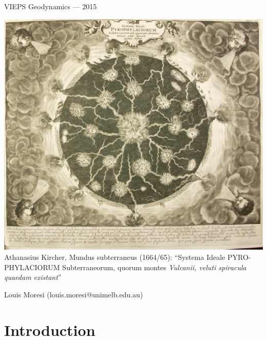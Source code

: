\documentclass[10pt]{article}
\begin{document}
\newcommand{\dGamma}{\mathbf{d}\boldsymbol{\Gamma}}
\newcommand{\erfc}{\mbox{\rm erfc}}
\newcommand{\Red     }[1]{\textcolor[rgb]{0.7,0.0,0.0}{#1}} 
\newcommand{\Green   }[1]{\textcolor[rgb]{0.0,0.7,0.0}{ #1}} 
\newcommand{\Blue    }[1]{\textcolor[rgb]{0.0,0.0,0.7}{ #1}} 
\newcommand{\Emerald }[1]{\textcolor[rgb]{0.0,0.7,0.3}{ #1}} 


\thispagestyle{empty}


\mbox{}
\vfill

{\Large VIEPS Geodynamics --- 2015} \\[2ex]
\vfill

\begin{center}
\includegraphics[width=0.9\linewidth]{MundusSubterraneusOriginal.jpg} \\[6ex]

Athanasius Kircher, Mundus subterraneus (1664/65): ``Systema Ideale PYRO-
PHYLACIORUM Subterraneorum, quorum montes \textit{Vulcanii, veluti spiracula
quaedam existant}''

\end{center}
\vfill
{\Large Louis Moresi (louis.moresi@unimelb.edu.au)}
\vfill

\newpage


\section{Introduction} %
\label{sec:introduction}
\end{document}
